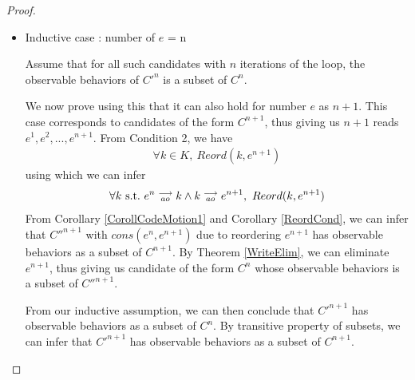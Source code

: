 \begin{proof}
\begin{itemize}
                    \item Inductive case : number of $e$ = n

                    Assume that for all such candidates with $n$ iterations of the loop, the observable behaviors of $C'^n$ is a subset of $C^n$.

                    We now prove using this that it can also hold for number $e$ as $n + 1$. 
                    This case corresponds to candidates of the form $C^{n+1}$, thus giving us $n+1$ reads $e^1, e^2,...,e^{n+1}$.
                    From Condition 2, we have
                    \begin{align*}
                        \forall k \in K, \ Reord(k,e^{n+1})
                    \end{align*}
                    using which we can infer 
                    \begin{align*}
                        \forall k \ \text{s.t.} \ e^n\stackrel{\longrightarrow}{_{ao}}k \wedge k\stackrel{\longrightarrow}{_{ao}}e^{n+1}, \ Reord(k,e^{n+1})
                    \end{align*}
                    From Corollary \ref{CorollCodeMotion1} and Corollary \ref{ReordCond}, we can infer that $C''^{n+1}$ with $cons(e^n, e^{n+1})$ due to reordering $e^{n+1}$ has observable behaviors as a subset of $C^{n+1}$. 
                    By Theorem \ref{WriteElim}, we can eliminate $e^{n+1}$, thus giving us candidate of the form $C^n$ whose observable behaviors is a subset of $C''^{n+1}$.

                    From our inductive assumption, we can then conclude that $C'^{n+1}$ has observable behaviors as a subset of $C^n$. 
                    By transitive property of subsets, we can infer that $C'^{n+1}$ has observable behaviors as a subset of $C^{n+1}$.


                \end{itemize}

            \end{proof}


